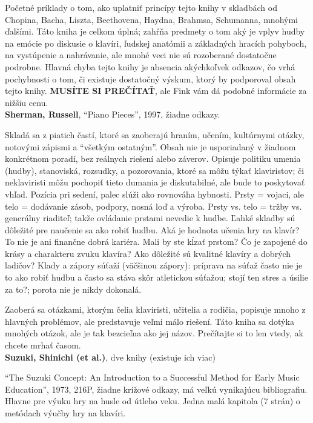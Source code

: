 Početné príklady o tom, ako uplatniť princípy tejto knihy v skladbách od Chopina, Bacha, Liszta, Beethovena, Haydna, Brahmsa, Schumanna, mnohými ďalšími. Táto kniha je celkom úplná; zahŕňa predmety o tom aký je vplyv hudby na emócie po diskusie o klavíri, ľudskej anatómii a základných hracích pohyboch, na vystúpenie a nahrávanie, ale mnohé veci nie sú rozoberané dostatočne podrobne. Hlavná chyba tejto knihy je absencia akýchkoľvek odkazov, čo vrhá pochybnosti o tom, či existuje dostatočný  výskum, ktorý by podporoval obsah tejto knihy. \textbf{MUSÍTE SI PREČÍTAŤ}, ale Fink vám dá podobné informácie za nižšiu cenu.
\medskip\\
\textbf{Sherman, Russell}, “Piano Pieces”, 1997, žiadne odkazy.

Skladá sa z piatich častí, ktoré sa zaoberajú hraním, učením, kultúrnymi otázky, notovými zápismi a “všetkým ostatným”. Obsah nie je usporiadaný v žiadnom konkrétnom poradí, bez reálnych riešení alebo záverov. Opisuje politiku umenia (hudby), stanoviská, rozsudky, a pozorovania, ktoré sa môžu týkať klaviristov; či neklaviristi môžu pochopiť tieto dumania je diskutabilné, ale bude to poskytovať vhľad. Pozícia pri sedení, palec slúži ako rovnováha hybnosti. Prsty = vojaci, ale telo = dodávanie zásob, podpory, nosná loď a výroba. Prsty vs. telo = tržby vs. generálny riaditeľ; takže ovládanie prstami nevedie k hudbe. Ľahké skladby sú dôležité pre naučenie sa ako robiť hudbu. Aká je hodnota učenia hry na klavír? To nie je ani finančne dobrá kariéra. Mali by ste kĺzať prstom? Čo je zapojené do krásy a charakteru zvuku klavíra? Ako dôležité sú kvalitné klavíry a dobrých ladičov? Klady a zápory súťaží (väčšinou zápory): príprava na súťaž často nie je to ako robiť hudbu a často sa stáva skôr atletickou súťažou; stojí ten stres a úsilie za to?; porota  nie je nikdy dokonalá. 

Zaoberá sa otázkami, ktorým čelia klaviristi, učitelia a rodičia, popisuje mnoho z hlavných problémov, ale predstavuje veľmi málo riešení. Táto kniha sa dotýka mnohých otázok, ale je tak bezcieľna ako jej názov. Prečítajte si to len vtedy, ak chcete mrhať časom. 
\medskip\\
\textbf{Suzuki, Shinichi (et al.)}, dve knihy (existuje ich viac)

“The Suzuki Concept: An Introduction to a Successful Method for Early Music Education”, 1973, 216P, žiadne krížové odkazy, má veľkú vynikajúcu bibliografiu. Hlavne pre výuku hry na husle od útleho veku. Jedna malá kapitola (7 strán) o metódach výučby hry na klavíri. 


